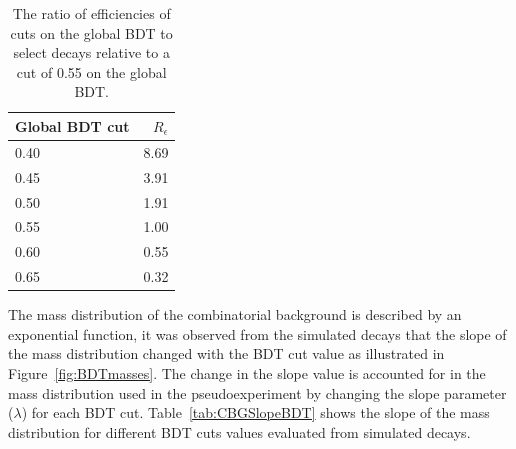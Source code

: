 {\begin{table}[htbp]
\begin{center}
\begin{tabular}{lr}
\toprule \toprule
Global BDT cut & $R_{\epsilon}$ \\ \midrule 
0.40 & 8.69 \\
0.45 & 3.91 \\
0.50 & 1.91 \\
0.55 & 1.00 \\
0.60 & 0.55 \\
0.65 & 0.32 \\ \bottomrule \bottomrule
\end{tabular}
\vspace{0.7cm}

\caption{The ratio of efficiencies of cuts on the global BDT to select \bbbarmumux decays relative to a cut of 0.55 on the global BDT. }
\label{tab:EfficiencyRatioCombBG}
\end{center}
\vspace{-1.0cm}
\end{table}


The mass distribution of the combinatorial background is described by an exponential function, it was observed from the simulated \bbbarmumux decays that the slope of the mass distribution changed with the BDT cut value as illustrated in Figure~\ref{fig:BDTmasses}. The change in the slope value is accounted for in the mass distribution used in the pseudoexperiment by changing the slope parameter ($\lambda$) for each BDT cut. Table~\ref{tab:CBGSlopeBDT} shows the slope of the mass distribution for different BDT cuts values evaluated from \bbbarmumux simulated decays.

}
